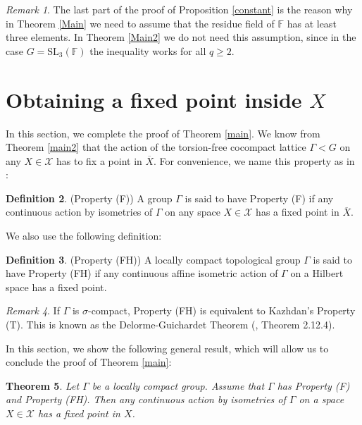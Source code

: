 \documentclass{article}
\theoremstyle{definition}
\newtheorem{dfn}{Definition}[section]
\theoremstyle{remark}
\newtheorem{rmk}[dfn]{Remark}
\theoremstyle{plain}
\newtheorem{thm}[dfn]{Theorem}
\begin{document}
\begin{rmk}
    The last part of the proof of Proposition \ref{constant} is the reason why in Theorem \ref{Main} we need to assume that the residue field of $\mathbb{F}$ has at least three elements. In Theorem \ref{Main2} we do not need this assumption, since in the case $G=\mathrm{SL}_3(\mathbb{F})$ the inequality works for all $q\geq 2$.
\end{rmk}

\section{Obtaining a fixed point inside $X$}

In this section, we complete the proof of Theorem \ref{main}. We know from Theorem \ref{main2} that the action of the torsion-free cocompact lattice $\Gamma<G$ on any $X\in\mathcal{X}$ has to fix a point in $\overline{X}$. For convenience, we name this property as in \cite{wang}:

\begin{dfn}{(Property (F))}
    A group $\Gamma$ is said to have Property (F) if any continuous action by isometries of $\Gamma$ on any space $X\in\mathcal{X}$ has a fixed point in $\overline{X}$. \\
\end{dfn}

We also use the following definition:

\begin{dfn}{(Property (FH))}
    A locally compact topological group $\Gamma$ is said to have Property (FH) if any continuous affine isometric action of $\Gamma$ on a Hilbert space has a fixed point. \\
\end{dfn}

\begin{rmk}
    If $\Gamma$ is $\sigma$-compact, Property (FH) is equivalent to Kazhdan's Property (T). This is known as the Delorme-Guichardet Theorem (\cite{kazhdanT}, Theorem 2.12.4). \\
\end{rmk}

In this section, we show the following general result, which will allow us to conclude the proof of Theorem \ref{main}:

\begin{thm} \label{main3}
    Let $\Gamma$ be a locally compact group. Assume that $\Gamma$ has Property (F) and Property (FH). Then any continuous action by isometries of $\Gamma$ on a space $X\in\mathcal{X}$ has a fixed point in $X$. \\
\end{thm}
\end{document}
